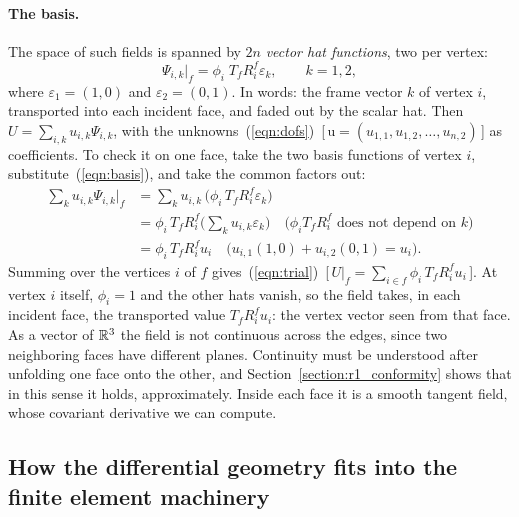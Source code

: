 \paragraph{The basis.} The space of such fields is spanned by $2n$ \emph{vector hat functions}, two per vertex:
\begin{equation}
\label{eqn:basis}
\Psi_{i,k}\big|_f = \phi_i\; T_f R_i^f \varepsilon_k, \qquad k = 1, 2,
\end{equation}
where $\varepsilon_1 = (1, 0)$ and $\varepsilon_2 = (0, 1)$. In words: the frame vector $k$ of vertex $i$, transported into each incident face, and faded out by the scalar hat. Then $U = \sum_{i,k} u_{i,k} \Psi_{i,k}$, with the unknowns~(\ref{eqn:dofs})~[\,$\mathrm u = (u_{1,1}, u_{1,2}, \ldots, u_{n,2})$\,] as coefficients. To check it on one face, take the two basis functions of vertex $i$, substitute~(\ref{eqn:basis}), and take the common factors out:
\begin{align*}
\sum_{k} u_{i,k}\Psi_{i,k}\big|_f &= \sum_k u_{i,k}\, \big(\phi_i\, T_f R_i^f \varepsilon_k\big) \\
&= \phi_i\, T_f R_i^f \Big(\sum_k u_{i,k}\varepsilon_k\Big) \quad \text{($\phi_i T_fR_i^f$ does not depend on $k$)}\\
&= \phi_i\, T_f R_i^f u_i \quad \text{($u_{i,1}(1,0) + u_{i,2}(0,1) = u_i$)} .
\end{align*}
Summing over the vertices $i$ of $f$ gives~(\ref{eqn:trial})~[\,$U|_f = \sum_{i\in f}\phi_i\, T_fR_i^f u_i$\,]. At vertex $i$ itself, $\phi_i = 1$ and the other hats vanish, so the field takes, in each incident face, the transported value $T_f R_i^f u_i$: the vertex vector seen from that face. As a vector of $\mathbb{R}^3$ the field is not continuous across the edges, since two neighboring faces have different planes. Continuity must be understood after unfolding one face onto the other, and Section~\ref{section:r1_conformity} shows that in this sense it holds, approximately. Inside each face it is a smooth tangent field, whose covariant derivative we can compute.

\subsection{How the differential geometry fits into the finite element machinery}
\label{section:r1_geometry_fem}

